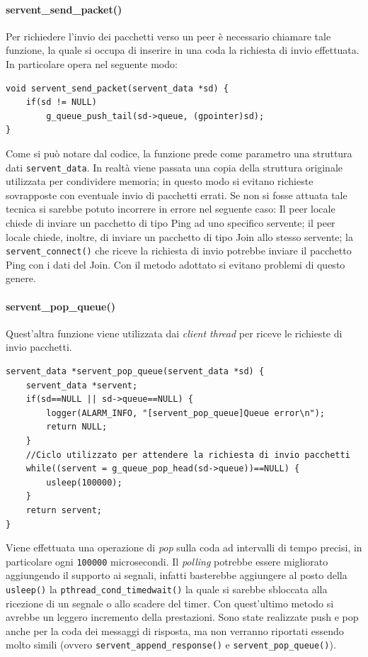 \paragraph{servent\_send\_packet()}
Per richiedere l'invio dei pacchetti verso un peer è necessario chiamare tale funzione, la quale si occupa di inserire in una coda la richiesta di invio effettuata. In particolare opera nel seguente modo:
\begin{lstlisting}[frame=trBL]
void servent_send_packet(servent_data *sd) {
	if(sd != NULL) 
		g_queue_push_tail(sd->queue, (gpointer)sd);
}
\end{lstlisting}
Come si può notare dal codice, la funzione prede come parametro una struttura dati \texttt{servent\_data}. In realtà viene passata una copia della struttura originale utilizzata per condividere memoria; in questo modo si evitano richieste sovrapposte con eventuale invio di pacchetti errati. Se non si fosse attuata tale tecnica si sarebbe potuto incorrere in errore nel seguente caso: Il peer locale chiede di inviare un pacchetto di tipo Ping ad uno specifico servente; il peer locale chiede, inoltre, di inviare un pacchetto di tipo Join allo stesso servente; la \texttt{servent\_connect()} che riceve la richiesta di invio potrebbe inviare il pacchetto Ping con i dati del Join. Con il metodo adottato si evitano problemi di questo genere.
\paragraph{servent\_pop\_queue()}
Quest'altra funzione viene utilizzata dai \textit{client thread} per riceve le richieste di invio pacchetti.
\begin{lstlisting}[frame=trBL]
servent_data *servent_pop_queue(servent_data *sd) {
	servent_data *servent;
	if(sd==NULL || sd->queue==NULL) {
		logger(ALARM_INFO, "[servent_pop_queue]Queue error\n");
		return NULL;
	}
	//Ciclo utilizzato per attendere la richiesta di invio pacchetti
	while((servent = g_queue_pop_head(sd->queue))==NULL) {
		usleep(100000);
	}
	return servent;
}
\end{lstlisting}
Viene effettuata una operazione di \textit{pop} sulla coda ad intervalli di tempo precisi, in particolare ogni \texttt{100000} microsecondi. Il \textit{polling} potrebbe essere migliorato aggiungendo il supporto ai segnali, infatti basterebbe aggiungere al posto della \texttt{usleep()} la \texttt{pthread\_cond\_timedwait()} la quale si sarebbe sbloccata alla ricezione di un segnale o allo scadere del timer. Con quest'ultimo metodo si avrebbe un leggero incremento della prestazioni. Sono state realizzate push e pop anche per la coda dei messaggi di risposta, ma non verranno riportati essendo molto simili (ovvero \texttt{servent\_append\_response()} e \texttt{servent\_pop\_queue()}).
